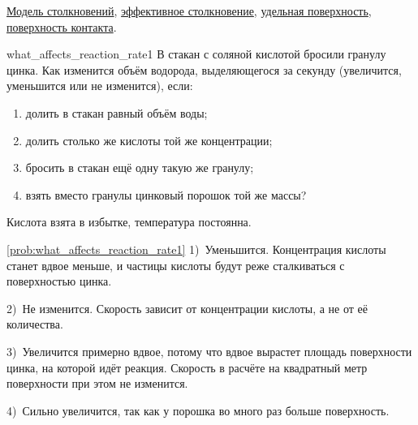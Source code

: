 \begin{termlist}
    \hyperref[term:collision_model]{Модель столкновений},
    \hyperref[term:effective_collision]{эффективное столкновение},
    \hyperref[term:specific_surface_area]{удельная поверхность},
    \hyperref[term:contact_surface]{поверхность контакта}.
\end{termlist}

\begin{problem}{}{what_affects_reaction_rate1}
    В стакан с соляной кислотой бросили гранулу цинка. Как изменится объём водорода, выделяющегося за секунду (увеличится, уменьшится или не изменится), если:
    \begin{enumerate}[label=\arabic*)]
        \item долить в стакан равный объём воды;
        \item долить столько же кислоты той же концентрации;
        \item бросить в стакан ещё одну такую же гранулу;
        \item взять вместо гранулы цинковый порошок той же массы?
    \end{enumerate}
    Кислота взята в избытке, температура постоянна.
    \begin{sol}{\ref{prob:what_affects_reaction_rate1}}
        1)~Уменьшится. Концентрация кислоты станет вдвое меньше, и частицы кислоты будут реже сталкиваться с поверхностью цинка.

        2)~Не изменится. Скорость зависит от концентрации кислоты, а не от её количества.

        3)~Увеличится примерно вдвое, потому что вдвое вырастет площадь поверхности цинка, на которой идёт реакция. Скорость в расчёте на квадратный метр поверхности при этом не изменится.

        4)~Сильно увеличится, так как у порошка во много раз больше поверхность.
    \end{sol}
\end{problem}

